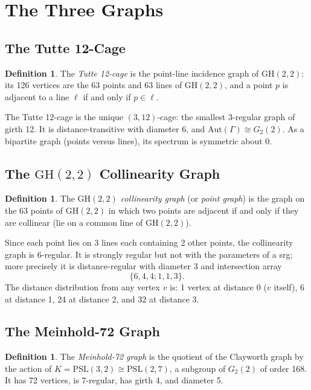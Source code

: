 \documentclass[11pt,a4paper]{article}
\theoremstyle{plain}
\theoremstyle{definition}
\newtheorem{definition}[theorem]{Definition}
\theoremstyle{remark}
\newcommand{\GH}{\mathrm{GH}(2,2)}
\newcommand{\PSL}{\mathrm{PSL}}
\newcommand{\Aut}{\mathrm{Aut}}
\begin{document}
\section{The Three Graphs}

\subsection{The Tutte 12-Cage}

\begin{definition}
The \emph{Tutte 12-cage} is the point-line incidence graph of $\GH$: its 126 vertices
are the 63 points and 63 lines of $\GH$, and a point $p$ is adjacent to a line $\ell$
if and only if $p \in \ell$.
\end{definition}

The Tutte 12-cage is the unique $(3,12)$-cage: the smallest 3-regular graph of girth 12.
It is distance-transitive with diameter 6, and $\Aut(\Gamma) \cong G_2(2)$.  As a
bipartite graph (points versus lines), its spectrum is symmetric about 0.

\subsection{The $\GH$ Collinearity Graph}

\begin{definition}
The \emph{$\GH$ collinearity graph} (or \emph{point graph}) is the graph on the 63 points
of $\GH$ in which two points are adjacent if and only if they are collinear (lie on a
common line of $\GH$).
\end{definition}

Since each point lies on 3 lines each containing 2 other points, the collinearity graph
is 6-regular.  It is strongly regular but not with the parameters of a srg; more precisely
it is distance-regular with diameter 3 and intersection array
\[
  \{6, 4, 4; 1, 1, 3\}.
\]
The distance distribution from any vertex $v$ is: 1 vertex at distance 0 ($v$ itself),
6 at distance 1, 24 at distance 2, and 32 at distance 3.

\subsection{The Meinhold-72 Graph}

\begin{definition}
The \emph{Meinhold-72 graph} is the quotient of the Clayworth graph by the action of
$K = \PSL(3,2) \cong \PSL(2,7)$, a subgroup of $G_2(2)$ of order 168.  It has 72 vertices,
is 7-regular, has girth 4, and diameter 5.
\end{definition}
\end{document}
